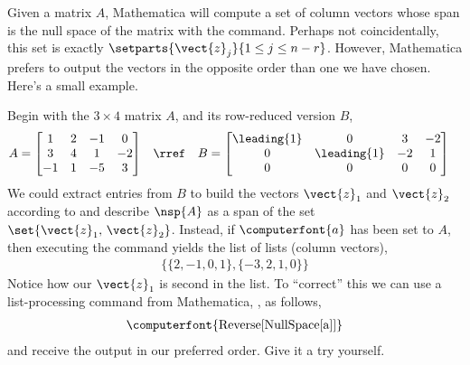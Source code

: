 Given a matrix $A$, Mathematica will compute a set of column vectors whose span is the null space of the matrix with the  command.  Perhaps not coincidentally, this set is exactly $\setparts{\vect{z}_j}{1\leq j\leq n-r}$.  However, Mathematica prefers to output the vectors in the opposite order than one we have chosen.  Here's a small example.\par
%
Begin with the $3\times 4$ matrix $A$, and its row-reduced version $B$,
%
\begin{align*}
A&=
\begin{bmatrix}
 1 & 2 & -1 & 0 \\
 3 & 4 & 1 & -2 \\
 -1 & 1 & -5 & 3
\end{bmatrix}
&
&\rref
&
B&=
\begin{bmatrix}
 \leading{1} & 0 & 3 & -2 \\
 0 & \leading{1} & -2 & 1 \\
 0 & 0 & 0 & 0
\end{bmatrix}
\end{align*}
%
We could extract entries from $B$ to build the vectors $\vect{z}_1$ and $\vect{z}_2$ according to  and describe $\nsp{A}$ as a span of the set $\set{\vect{z}_1,\,\vect{z}_2}$.  Instead, if $\computerfont{a}$ has been set to $A$, then executing the command  yields the list of lists (column vectors),
%
\begin{align*}
\{\{2, -1, 0, 1\}, \{-3, 2, 1, 0\}\}
\end{align*}
%
Notice how our $\vect{z}_1$ is second in the list.  To ``correct'' this we can use a list-processing command from Mathematica, , as follows,
%
\begin{align*}
\text{\computerfont{Reverse[NullSpace[a]]}}
\end{align*}
%
and receive the output in our preferred order.  Give it a try yourself.
